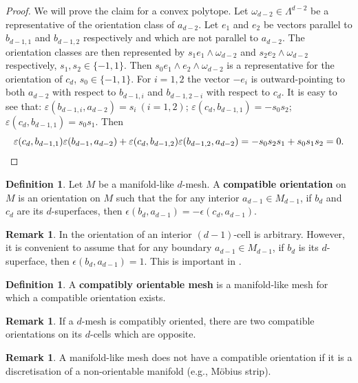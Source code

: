 \documentclass{elsarticle}
\theoremstyle{definition}
\newtheorem{definition}[theorem]{Definition}
\newtheorem{remark}[theorem]{Remark}
\begin{document}
\begin{proof}
  We will prove the claim for a convex polytope.
  Let $\omega_{d - 2} \in \Lambda^{d - 2}$ be a representative of the orientation class of $a_{d - 2}$. Let $e_1$ and $e_2$ be vectors parallel to $b_{d - 1, 1}$ and $b_{d - 1, 2}$ respectively and which are not parallel to $a_{d - 2}$. The orientation classes are then represented by $s_1 e_1 \wedge \omega_{d - 2}$ and $s_2 e_2 \wedge \omega_{d - 2}$ respectively, $s_1, s_2 \in \{-1, 1\}$. Then $s_0 e_1 \wedge e_2 \wedge \omega_{d - 2}$ is a representative for the orientation of $c_d$, $s_0 \in \{-1 , 1\}$.
  For $i = 1, 2$ the vector $-e_i$ is outward-pointing to both $a_{d - 2}$ with respect to $b_{d - 1, i}$ and $b_{d - 1, 2 - i}$ with respect to $c_d$. It is easy to see that: $\varepsilon(b_{d - 1, i}, a_{d - 2}) = s_i\ (i = 1, 2)$; $\varepsilon(c_d, b_{d - 1, 1}) = -s_0 s_2$; $\varepsilon(c_d, b_{d - 1, 1}) = s_0 s_1$. Then
  \begin{equation*}
    \varepsilon(c_d, b_{d - 1, 1}) \varepsilon(b_{d - 1}, a_{d - 2})
    + \varepsilon(c_d, b_{d - 1, 2}) \varepsilon(b_{d - 1, 2}, a_{d - 2})
    = -s_0 s_2 s_1 + s_0 s_1 s_2 = 0. \qedhere
  \end{equation*}
\end{proof}
\begin{definition}
\label{thm:orientation_compatible}
  Let $M$ be a manifold-like $d$-mesh. A \textbf{compatible orientation} on $M$ is an orientation on $M$ such that the for any interior $a_{d - 1} \in M_{d - 1}$, if $b_d$ and $c_d$ are its $d$-superfaces, then $\epsilon(b_d, a_{d - 1}) = - \epsilon(c_d, a_{d - 1})$.
\end{definition}
\begin{remark}
  In  the orientation of an interior $(d - 1)$-cell is arbitrary. However, it is convenient to assume that for any boundary $a_{d - 1} \in M_{d - 1}$, if $b_d$ is its $d$-superface, then $\epsilon(b_d, a_{d - 1}) = 1$. This is important in .
\end{remark}
\begin{definition}
  A \textbf{compatibly orientable mesh} is a manifold-like mesh for which a compatible orientation exists.
\end{definition}
\begin{remark}
  If a $d$-mesh is compatibly oriented, there are two compatible orientations on its $d$-cells which are opposite.
\end{remark}
\begin{remark}
  A manifold-like mesh does not have a compatible orientation if it is a discretisation of a non-orientable manifold (e.g., M\"{o}bius strip).
\end{remark}
\end{document}
